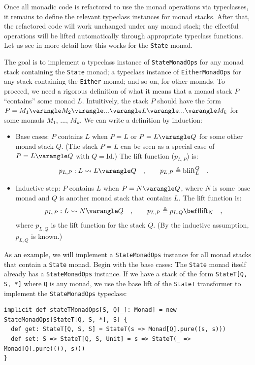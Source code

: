 Once all monadic code is refactored to use the monad operations via
typeclasses, it remains to define the relevant typeclass instances
for monad stacks. After that, the refactored code will work unchanged
under any monad stack; the effectful operations will be lifted automatically
through appropriate typeclass functions. Let us see in more detail
how this works for the \lstinline!State! monad.

The goal is to implement a typeclass instance of \lstinline!StateMonadOps!
for any monad stack containing the \lstinline!State! monad; a typeclass
instance of \lstinline!EitherMonadOps! for any stack containing the
\lstinline!Either! monad; and so on, for other monads. To proceed,
we need a rigorous definition of what it means that a monad stack
$P$ \textsf{``}contains\textsf{''} some monad $L$. Intuitively, the stack $P$ should
have the form $P=M_{1}\varangle M_{2}\varangle...\varangle L\varangle...\varangle M_{k}$
for some monads $M_{1}$, ..., $M_{k}$. We can write a definition
by induction: 
\begin{itemize}
\item Base cases: $P$ contains $L$ when $P=L$ or $P=L\varangle Q$ for
some other monad stack $Q$. (The stack $P=L$ can be seen as a special
case of $P=L\varangle Q$ with $Q=\text{Id}$.) The lift function
($p_{L,P}$) is:
\[
p_{L,P}:L\leadsto L\varangle Q\quad,\quad\quad p_{L,P}\triangleq\text{blift}_{L}^{Q}\quad.
\]
\item Inductive step: $P$ contains $L$ when $P=N\varangle Q$, where $N$
is some base monad and $Q$ is another monad stack that contains $L$.
The lift function is:
\[
p_{L,P}:L\leadsto N\varangle Q\quad,\quad\quad p_{L,P}\triangleq p_{L,Q}\bef\text{flift}_{N}\quad,
\]
where $p_{L,Q}$ is the lift function for the stack $Q$. (By the
inductive assumption, $p_{L,Q}$ is known.)
\end{itemize}
As an example, we will implement a \lstinline!StateMonadOps! instance
for all monad stacks that contain a \lstinline!State! monad. Begin
with the base cases: The \lstinline!State! monad itself already has
a \lstinline!StateMonadOps! instance. If we have a stack of the form
\lstinline!StateT[Q, S, *]! where \lstinline!Q! is any monad, we
use the base lift of the \lstinline!StateT! transformer to implement
the \lstinline!StateMonadOps! typeclass:
\begin{lstlisting}
implicit def stateTMonadOps[S, Q[_]: Monad] = new StateMonadOps[StateT[Q, S, *], S] {
  def get: StateT[Q, S, S] = StateT(s => Monad[Q].pure((s, s)))
  def set: S => StateT[Q, S, Unit] = s => StateT(_ => Monad[Q].pure(((), s)))
}
\end{lstlisting}

